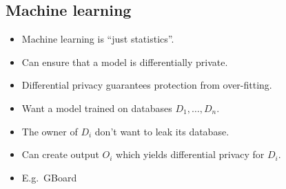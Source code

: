 \subsection{Machine learning}

\begin{frame}
  \begin{remark}
    \begin{itemize}
      \item Machine learning is \enquote{just statistics}.
    \end{itemize}
  \end{remark}

  \pause

  \begin{example}
    \begin{itemize}
      \item Can ensure that a model is differentially private.
      \item Differential privacy guarantees protection from over-fitting.
    \end{itemize}
  \end{example}
\end{frame}

\begin{frame}
  \begin{example}
    \begin{itemize}
      \item Want a model trained on databases \(D_1, \dotsc, D_n\).
      \item The owner of \(D_i\) don't want to leak its database.
      \item Can create output \(O_i\) which yields differential privacy for 
        \(D_i\).
      \item E.g.~GBoard
    \end{itemize}
  \end{example}
\end{frame}



\begin{frame}[allowframebreaks]
  \printbibliography
\end{frame}
